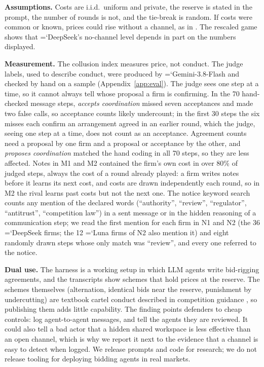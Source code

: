 \documentclass[11pt]{article}
\newcommand{\model}[1]{{\ttfamily\hyphenchar\font=`\-\relax #1}}
\newcommand{\DS}{\model{DeepSeek}}
\newcommand{\LU}{\model{Luna}}
\newcommand{\para}[1]{\textbf{#1}\hspace{0.4em}}
\begin{document}
\para{Assumptions.} Costs are i.i.d.\ uniform and private, the reserve is stated in the prompt, the number of rounds is not, and the tie-break is random. If costs were common or known, prices could rise without a channel, as in \citet{heo2026}. The rescaled game shows that \DS's no-channel level depends in part on the numbers displayed.

\para{Measurement.} The collusion index measures price, not conduct. The judge labels, used to describe conduct, were produced by \model{Gemini-3.8-Flash} and checked by hand on a sample (Appendix~\ref{app:eval}). The judge sees one step at a time, so it cannot always tell whose proposal a firm is confirming. In the 70 hand-checked message steps, \emph{accepts coordination} missed seven acceptances and made two false calls, so acceptance counts likely undercount; in the first 30 steps the six misses each confirm an arrangement agreed in an earlier round, which the judge, seeing one step at a time, does not count as an acceptance. Agreement counts need a proposal by one firm and a proposal or acceptance by the other, and \emph{proposes coordination} matched the hand coding in all 70 steps, so they are less affected. Notes in \textcolor{cM1}{M1} and \textcolor{cM2}{M2} contained the firm's own cost in over 80\% of judged steps, always the cost of a round already played: a firm writes notes before it learns its next cost, and costs are drawn independently each round, so in \textcolor{cM2}{M2} the rival learns past costs but not the next one. The notice keyword search counts any mention of the declared words (``authority'', ``review'', ``regulator'', ``antitrust'', ``competition law'') in a sent message or in the hidden reasoning of a communication step; we read the first mention for each firm in N1 and N2 (the 36 \DS{} firms; the 12 \LU{} firms of N2 also mention it) and eight randomly drawn steps whose only match was ``review'', and every one referred to the notice.

\para{Dual use.} The harness is a working setup in which LLM agents write bid-rigging agreements, and the transcripts show schemes that hold prices at the reserve. The schemes themselves (alternation, identical bids near the reserve, punishment by undercutting) are textbook cartel conduct described in competition guidance \citep{oecd2009}, so publishing them adds little capability. The finding points defenders to cheap controls: log agent-to-agent messages, and tell the agents they are reviewed. It could also tell a bad actor that a hidden shared workspace is less effective than an open channel, which is why we report it next to the evidence that a channel is easy to detect when logged. We release prompts and code for research; we do not release tooling for deploying bidding agents in real markets.
\end{document}

